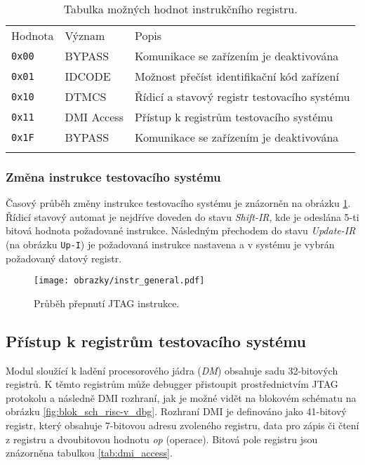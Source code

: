 \begin{table}[!h]
  \caption{Tabulka možných hodnot instrukčního registru. \cite{risc-v_dbg}}
  \begin{center}
  	\small
	  \begin{tabular}{!{\vrule width 1.2pt}M{1.5cm}|M{2.5cm}|M{9cm}!{\vrule width 1.2pt}}
	    Hodnota & Význam & Popis\\
	    \texttt{0x00} & BYPASS & Komunikace se zařízením je deaktivována\\
			\hline	    
			\texttt{0x01} & IDCODE & Možnost přečíst identifikační kód zařízení\\
			\hline
			\texttt{0x10} & DTMCS & Řídicí a stavový registr testovacího systému\\
			\hline	    
			\texttt{0x11} & DMI Access & Přístup k registrům testovacího systému\\
			\hline
			\texttt{0x1F} & BYPASS & Komunikace se zařízením je deaktivována\\
			\hline
		\end{tabular}
  \end{center}
	\label{tab:jtag_instr}
\end{table}

\subsubsection{Změna instrukce testovacího systému}
Časový průběh změny instrukce testovacího systému je znázorněn na obrázku \ref{fig:jtag_instr}. Řídicí stavový automat je nejdříve doveden do stavu \textit{Shift-IR}, kde je odeslána 5-ti bitová hodnota požadované instrukce. Následným přechodem do stavu \textit{Update-IR} (na obrázku \texttt{Up-I}) je požadovaná instrukce nastavena a v systému je vybrán požadovaný datový registr. 

\begin{figure}[!h]
  \begin{center}
    \texttt{[image: obrazky/instr\_general.pdf]}
  \end{center}
  \caption{Průběh přepnutí \acs{JTAG} instrukce.}
	\label{fig:jtag_instr}
\end{figure}

\subsection{Přístup k registrům testovacího systému}		\label{subsec:dm_reg_access}
Modul sloužící k ladění procesorového jádra (\textit{\acl{DM}}) obsahuje sadu 32-bitových registrů. K těmto registrům může debugger přistoupit prostřednictvím \acs{JTAG} protokolu a následně \acs{DMI} rozhraní, jak je možné vidět na blokovém schématu na obrázku \ref{fig:blok_sch_risc-v_dbg}. Rozhraní \acs{DMI} je definováno jako 41-bitový registr, který obsahuje 7-bitovou adresu zvoleného registru, data pro zápis či čtení z registru a dvoubitovou hodnotu \textit{op} (operace). Bitová pole registru jsou znázorněna tabulkou \ref{tab:dmi_access}. \cite{risc-v_dbg}

